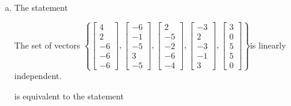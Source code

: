 \begin{exerciseAnswer}
\begin{enumerate}[(a)]
\item The statement 
\begin{center}\begin{minipage}{0.8\textwidth}
 The set of vectors \( \left\{ \left[\begin{array}{c}
4 \\
2 \\
-6 \\
-6 \\
-6
\end{array}\right] , \left[\begin{array}{c}
-6 \\
-1 \\
-5 \\
3 \\
-5
\end{array}\right] , \left[\begin{array}{c}
2 \\
-5 \\
-2 \\
-6 \\
-4
\end{array}\right] , \left[\begin{array}{c}
-3 \\
2 \\
-3 \\
-1 \\
3
\end{array}\right] , \left[\begin{array}{c}
3 \\
0 \\
5 \\
5 \\
0
\end{array}\right] \right\} \)is linearly independent.
\end{minipage}\end{center}
     is equivalent to the statement 
\begin{center}\begin{minipage}{0.8\textwidth}
 The vector equation \( x_{1} \left[\begin{array}{c}
4 \\
2 \\
-6 \\
-6 \\
-6
\end{array}\right] + x_{2} \left[\begin{array}{c}
-6 \\
-1 \\

\end{array}
\end{minipage}
\end{center}
\end{enumerate}
\end{exerciseAnswer}
